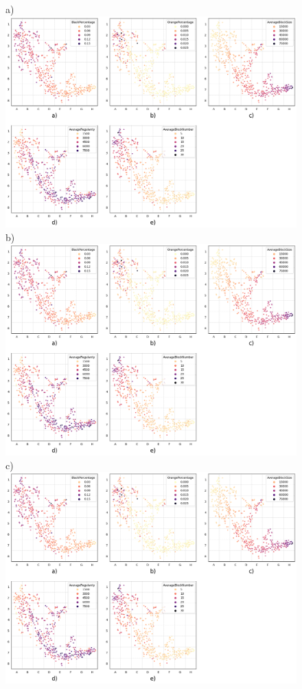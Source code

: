 \documentclass[preprint,12pt]{elsarticle}
\begin{document}
\begin{figure}
\centering
\scriptsize{a)} \includegraphics[trim={ 7 416 703 0 },clip,scale=0.40]{Images/City_Types_Dimension_chessboard.png}
\scriptsize{b)} \includegraphics[trim={ 357 416 350 0 },clip,scale=0.40]{Images/City_Types_Dimension_chessboard.png}
\\ \scriptsize{c)} \includegraphics[trim={ 703 416 0 0 },clip,scale=0.40]{Images/City_Types_Dimension_chessboard.png}

\end{figure}
\end{document}
